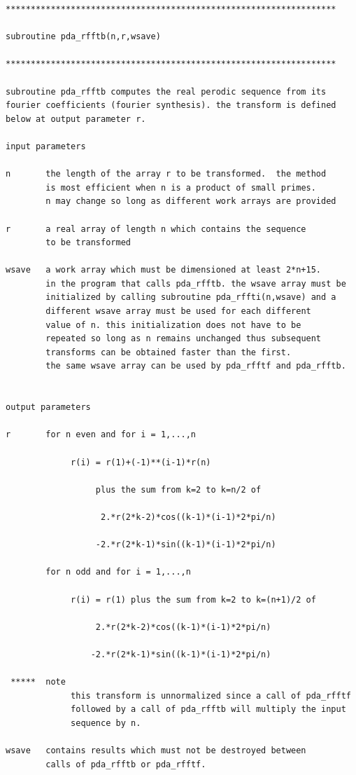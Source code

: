 \documentclass[11pt,twoside]{article}
\begin{document}
\begin{verbatim}
******************************************************************

subroutine pda_rfftb(n,r,wsave)

******************************************************************

subroutine pda_rfftb computes the real perodic sequence from its
fourier coefficients (fourier synthesis). the transform is defined
below at output parameter r.

input parameters

n       the length of the array r to be transformed.  the method
        is most efficient when n is a product of small primes.
        n may change so long as different work arrays are provided

r       a real array of length n which contains the sequence
        to be transformed

wsave   a work array which must be dimensioned at least 2*n+15.
        in the program that calls pda_rfftb. the wsave array must be
        initialized by calling subroutine pda_rffti(n,wsave) and a
        different wsave array must be used for each different
        value of n. this initialization does not have to be
        repeated so long as n remains unchanged thus subsequent
        transforms can be obtained faster than the first.
        the same wsave array can be used by pda_rfftf and pda_rfftb.


output parameters

r       for n even and for i = 1,...,n

             r(i) = r(1)+(-1)**(i-1)*r(n)

                  plus the sum from k=2 to k=n/2 of

                   2.*r(2*k-2)*cos((k-1)*(i-1)*2*pi/n)

                  -2.*r(2*k-1)*sin((k-1)*(i-1)*2*pi/n)

        for n odd and for i = 1,...,n

             r(i) = r(1) plus the sum from k=2 to k=(n+1)/2 of

                  2.*r(2*k-2)*cos((k-1)*(i-1)*2*pi/n)

                 -2.*r(2*k-1)*sin((k-1)*(i-1)*2*pi/n)

 *****  note
             this transform is unnormalized since a call of pda_rfftf
             followed by a call of pda_rfftb will multiply the input
             sequence by n.

wsave   contains results which must not be destroyed between
        calls of pda_rfftb or pda_rfftf.
\end{verbatim}
\end{document}
